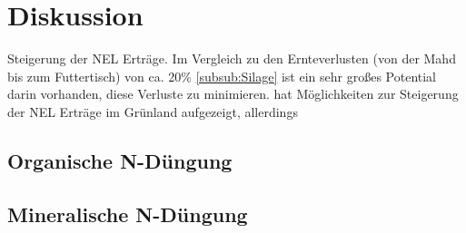 
\section{Diskussion}
\label{sec:Disukussion}
Steigerung der \ac{NEL} Erträge.
Im Vergleich zu den Ernteverlusten (von der Mahd bis zum Futtertisch) von ca. 20\% \cref{subsub:Silage} ist ein sehr großes Potential darin vorhanden, diese Verluste zu minimieren.
\textcite[33-36]{weggler2050leguminosen} hat Möglichkeiten zur Steigerung der \ac{NEL} Erträge im Grünland aufgezeigt, allerdings

\subsection{Organische N-Düngung}
\label{subsec:Dis:orgN}

\subsection{Mineralische N-Düngung}
\label{subsec:Dis:minN}

